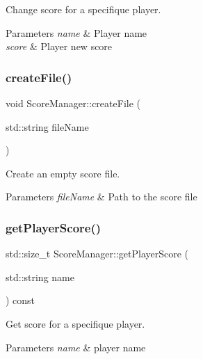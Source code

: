 Change score for a specifique player. 


\begin{DoxyParams}{Parameters}
{\em name} & Player name \\
\hline
{\em score} & Player new score \\
\hline
\end{DoxyParams}
\mbox{\label{classScoreManager_abbe17770ef85b2575fd14acf90a0bc9f}} 
\subsubsection{\texorpdfstring{create\+File()}{createFile()}}
{\footnotesize\ttfamily void Score\+Manager\+::create\+File (\begin{DoxyParamCaption}\item[{std\+::string}]{file\+Name }\end{DoxyParamCaption})}



Create an empty score file. 


\begin{DoxyParams}{Parameters}
{\em file\+Name} & Path to the score file \\
\hline
\end{DoxyParams}
\mbox{\label{classScoreManager_abc6c1d76fdcc17f1b8ebe4c7bf5550e2}} 
\subsubsection{\texorpdfstring{get\+Player\+Score()}{getPlayerScore()}}
{\footnotesize\ttfamily std\+::size\+\_\+t Score\+Manager\+::get\+Player\+Score (\begin{DoxyParamCaption}\item[{std\+::string}]{name }\end{DoxyParamCaption}) const}



Get score for a specifique player. 


\begin{DoxyParams}{Parameters}
{\em name} & player name \\
\hline
\end{DoxyParams}
\mbox{\label{classScoreManager_a4c345e9d06ef6f7fb937c43fa51dddd5}} 
